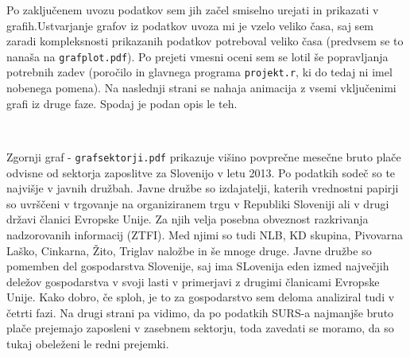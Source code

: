 \documentclass[11pt,a4paper]{article}
\begin{document}
Po zaključenem uvozu podatkov sem jih začel smiselno urejati in prikazati v grafih.Ustvarjanje grafov iz podatkov uvoza mi je vzelo veliko časa, saj sem zaradi kompleksnosti prikazanih podatkov potreboval veliko časa (pred\-vsem se to nanaša na \verb|grafplot.pdf|). Po prejeti vmesni oceni sem se lotil še popravljanja potrebnih zadev (poročilo in glavnega programa \verb|projekt.r|, ki do tedaj ni imel nobenega pomena). Na naslednji strani se nahaja animacija z vsemi vključenimi grafi iz druge faze. Spodaj je podan opis le teh.
% 
% 
% 
% 
% 
% 
% 
% 
% 
% 
% 
% 
% 
% 
% 

\begin{center}
\\
\end{center}

Zgornji graf - \verb|grafsektorji.pdf| prikazuje višino povprečne mesečne bru\-to plače odvisne od sektorja zaposlitve za Slovenijo v letu 2013. Po podatkih sodeč so te najvišje v javnih družbah. Javne družbe so izdajatelji, katerih vrednostni papirji so uvrščeni v trgovanje na organiziranem trgu v Republiki Sloveniji ali v drugi državi članici Evropske Unije. Za njih velja posebna obveznost razkrivanja nadzorovanih informacij (ZTFI). Med njimi so tudi NLB, KD skupina, Pivovarna Laško, Cinkarna, Žito, Triglav naložbe in še mnoge druge. Javne družbe so pomemben del gospodarstva Slovenije, saj ima SLovenija eden izmed največjih deležov gospodarstva v svoji lasti v primerjavi z drugimi članicami Evropske Unije. Kako dobro, če sploh, je to za gospodarstvo sem deloma analiziral tudi v četrti fazi. Na drugi strani pa vidimo, da po podatkih SURS-a najmanjše bruto plače prejemajo zaposleni v zasebnem sektorju, toda zavedati se moramo, da so tukaj obeleženi le redni prejemki.
\end{document}
